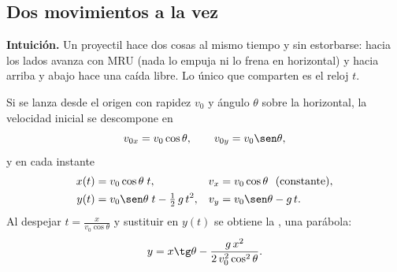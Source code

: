 \documentclass[11pt,a4paper]{article}
\begin{document}
\subsection{Dos movimientos a la vez}
\textbf{Intuición.} Un proyectil hace dos cosas al mismo tiempo y sin estorbarse: hacia los lados avanza con MRU
(nada lo empuja ni lo frena en horizontal) y hacia arriba y abajo hace una caída libre. Lo único que comparten es el
reloj $t$.
\begin{definicion}
Si se lanza desde el origen con rapidez $v_0$ y ángulo $\theta$ sobre la horizontal, la velocidad inicial se descompone en
\[ v_{0x}=v_0\cos\theta,\qquad v_{0y}=v_0\sen\theta, \]
y en cada instante
\begin{align*}
x(t)&=v_0\cos\theta\;t, & v_x&=v_0\cos\theta \ \ (\text{constante}),\\
y(t)&=v_0\sen\theta\;t-\tfrac12\,g\,t^{2}, & v_y&=v_0\sen\theta-g\,t.
\end{align*}
Al despejar $t=\frac{x}{v_0\cos\theta}$ y sustituir en $y(t)$ se obtiene la , una parábola:
\[ y=x\tg\theta-\frac{g\,x^{2}}{2\,v_0^{2}\cos^{2}\theta}. \]
\end{definicion}
\end{document}
